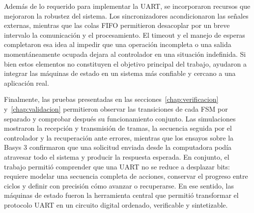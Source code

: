 Además de lo requerido para implementar la UART, se incorporaron
recursos que mejoraron la robustez del sistema. Los sincronizadores
acondicionaron las señales externas, mientras que las colas FIFO
permitieron desacoplar por un breve intervalo la comunicación y el
procesamiento. El timeout y el manejo de esperas completaron esa idea
al impedir que una operación incompleta o una salida momentáneamente
ocupada dejara al controlador en una situación indefinida. Si bien
estos elementos no constituyen el objetivo principal del trabajo,
ayudaron a integrar las máquinas de estado en un sistema más
confiable y cercano a una aplicación real.

Finalmente, las pruebas presentadas en las
secciones~\ref{chap:verificacion} y~\ref{chap:validacion} permitieron
observar las transiciones de cada FSM por separado y comprobar
después su funcionamiento conjunto. Las simulaciones mostraron la
recepción y transmisión de tramas, la secuencia seguida por el
controlador y la recuperación ante errores, mientras que los ensayos
sobre la Basys 3 confirmaron que una solicitud enviada desde la
computadora podía atravesar todo el sistema y producir la respuesta
esperada. En conjunto, el trabajo permitió comprender que una UART no
se reduce a desplazar bits: requiere modelar una secuencia completa
de acciones, conservar el progreso entre ciclos y definir con
precisión cómo avanzar o recuperarse. En ese sentido, las máquinas de
estado fueron la herramienta central que permitió transformar el
protocolo UART en un circuito digital ordenado, verificable y sintetizable.
